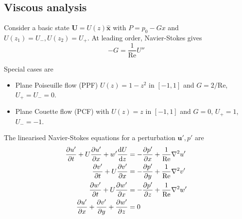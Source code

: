 \documentclass{jknotes}
\renewcommand{\u}{\symbf{u}}
\newcommand{\ReN}{\text{Re}}
\begin{document}
\subsection{Viscous analysis}
Consider a basic state $\symbf{U} = U(z)\hat{\symbf{x}}$ with $P = p_0 - Gx$
and $U(z_1) = U_-, U(z_2) = U_+$. At leading order, Navier-Stokes gives
\begin{equation}
	-G = \frac{1}{\ReN}U''
\end{equation}
\begin{center}
\end{center}

Special cases are
\begin{itemize}
	\item Plane Poiseuille flow (PPF) $U(z) = 1-z^2$ in $\left[-1,1\right]$
		and $G = 2/\ReN$,$U_+ = U_- = 0$.
	\item Plane Couette flow (PCF) with $U(z) = z$ in $\left[-1,1\right]$ and
		$G = 0$, $U_+ = 1$, $U_- = -1$.
\end{itemize}
The linearised Navier-Stokes equations for a perturbation $\u', p'$ are
\begin{align}
	\frac{\partial u'}{\partial t} + U \frac{\partial u'}{\partial x} + w'
	\frac{\diffd U}{\diffd z} &= -\frac{\partial p'}{\partial x} +
	\frac{1}{\ReN} \nabla^2 u' \label{eq:l8:1}\\
	\frac{\partial v'}{\partial t} + U \frac{\partial v'}{\partial x}
							  &= -\frac{\partial p'}{\partial y} + 
							  \frac{1}{\ReN} \nabla^2 v' \label{eq:l8:2}\\
	\frac{\partial w'}{\partial t} + U \frac{\partial w'}{\partial x}
							  &= -\frac{\partial p'}{\partial z} + 
							  \frac{1}{\ReN} \nabla^2 w' \label{eq:l8:3} \\
	\frac{\partial u'}{\partial x} + \frac{\partial v'}{\partial y} +
	\frac{\partial w'}{\partial z} &= 0\label{eq:l8:4}
\end{align}
\end{document}

